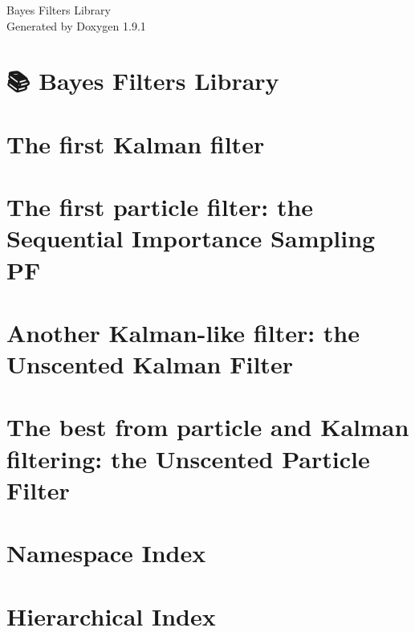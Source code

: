 \let\mypdfximage\pdfximage\def\pdfximage{\immediate\mypdfximage}\documentclass[twoside]{book}
\newcommand{\+}{\discretionary{\mbox{\scriptsize$\hookleftarrow$}}{}{}}
\newcommand{\clearemptydoublepage}{%
  \newpage{\pagestyle{empty}\cleardoublepage}%
}
\begin{document}
\raggedbottom

\hypersetup{pageanchor=false,
             bookmarksnumbered=true,
             pdfencoding=unicode
            }
\begin{titlepage}
\vspace*{7cm}
\begin{center}%
{\Large Bayes Filters Library }\\
\vspace*{1cm}
{\large Generated by Doxygen 1.9.1}\\
\end{center}
\end{titlepage}
\clearemptydoublepage
{}
\tableofcontents
\clearemptydoublepage
{}
\hypersetup{pageanchor=true}

\chapter{📚 Bayes Filters Library}
\label{index}\hypertarget{index}{}
\chapter{The first Kalman filter}
\label{kf}

\chapter{The first particle filter\+: the Sequential Importance Sampling PF}
\label{sis}

\chapter{Another Kalman-\/like filter\+: the Unscented Kalman Filter}
\label{ukf}

\chapter{The best from particle and Kalman filtering\+: the Unscented Particle Filter}
\label{upf}

\chapter{Namespace Index}

\chapter{Hierarchical Index}

\end{document}
